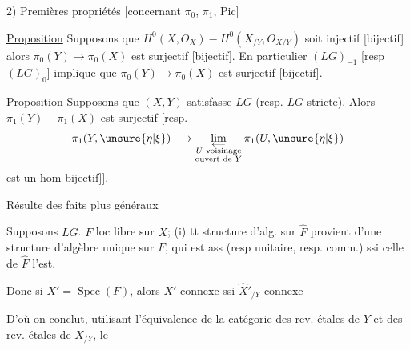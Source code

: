 
2) Premières propriétés [concernant $\pi_0$, $\pi_1$, Pic]

\uline{Proposition} Supposons que
$H^0(X,O_X)\mathbin{-}H^0(X_{/Y},O_{X/Y})$
soit injectif [bijectif] alors
$\pi_0(Y)\longrightarrow\pi_0(X)$ est surjectif [bijectif].
En particulier $(LG)_{-1}$ [resp $(LG)_0$] implique que
$\pi_0(Y)\longrightarrow\pi_0(X)$ est surjectif [bijectif].

\uline{Proposition} Supposons que $(X,Y)$ satisfasse
$LG$ (resp. $LG$ stricte).
Alors $\pi_1(Y)\mathbin{-}\pi_1(X)$ est surjectif [resp.
\[
\pi_1(Y,\unsure{\eta|\xi})\longrightarrow
\mathop{\mathrm{lim}}_{\substack{\longleftarrow\\
U\text{ voisinage}\\\text{ouvert de }Y}}
\pi_1(U,\unsure{\eta|\xi})
\]
est un hom \deleted{surjectif [resp.} bijectif]].

Résulte des faits plus généraux

\uline{} 
Supposons $LG$. 
$F$ loc libre sur $X$;
(i) tt structure d'alg.
 sur $\hat F$ provient d'une structure
d'algèbre unique sur $F$, qui est ass (resp unitaire,
resp. comm.) ssi celle de $\hat F$ l'est.

Donc si $X'=\operatorname{Spec}(F)$, alors $X'$ connexe
ssi $\hat X'_{/Y}$ connexe




D'où on conclut, utilisant l'équivalence de la catégorie
des rev. étales de $Y$ et des rev. étales de $X_{/Y}$, le

